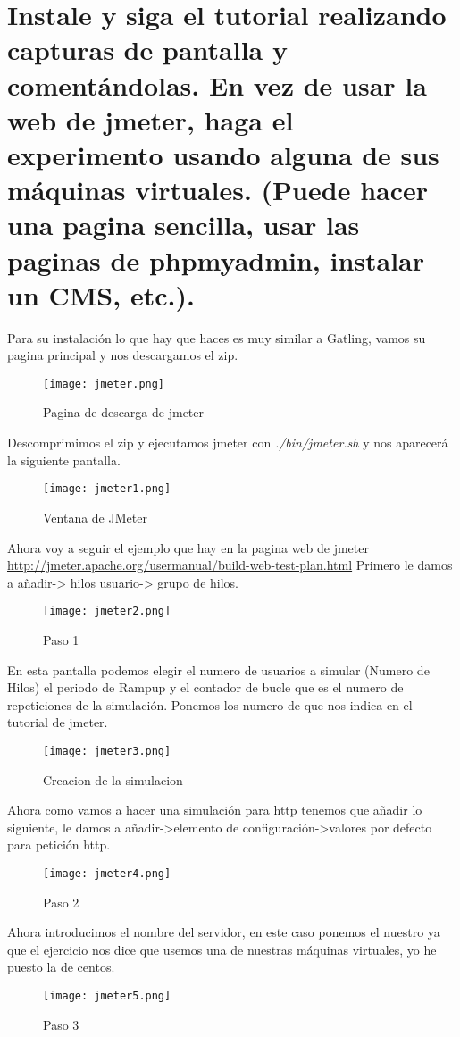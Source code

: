 \section{Instale y siga el tutorial realizando capturas de pantalla y comentándolas. En vez de usar la web de jmeter, haga el experimento usando alguna de sus máquinas virtuales. (Puede hacer una pagina sencilla, usar las paginas de phpmyadmin, instalar un CMS, etc.).}
Para su instalación lo que hay que haces es muy similar a Gatling, vamos su pagina principal y nos descargamos el zip.
\begin{figure}[H] 
\centering
\texttt{[image: jmeter.png]}  
\label{figura30:}
\caption{Pagina de descarga de jmeter}
\end{figure}
Descomprimimos el zip y ejecutamos jmeter con \textit{./bin/jmeter.sh} y nos aparecerá la siguiente pantalla.
\begin{figure}[H] 
\centering
\texttt{[image: jmeter1.png]}  
\label{figura31:}
\caption{Ventana de JMeter}
\end{figure}
Ahora voy a seguir el ejemplo que hay en la pagina web de jmeter \url{http://jmeter.apache.org/usermanual/build-web-test-plan.html} 
Primero le damos a añadir-> hilos usuario-> grupo de hilos.
\begin{figure}[H] 
\centering
\texttt{[image: jmeter2.png]}  
\label{figura32:}
\caption{Paso 1}
\end{figure}
En esta pantalla podemos elegir el numero de usuarios a simular (Numero de Hilos) el periodo de Rampup y el contador de bucle que es el numero de repeticiones de la simulación. Ponemos los numero de que nos indica en el tutorial de jmeter.
\begin{figure}[H] 
\centering
\texttt{[image: jmeter3.png]}  
\label{figura33:}
\caption{Creacion de la simulacion}
\end{figure}
Ahora como vamos a hacer una simulación para http tenemos que añadir lo siguiente, le damos a añadir->elemento de configuración->valores por defecto para petición http.
\begin{figure}[H] 
\centering
\texttt{[image: jmeter4.png]}  
\label{figura34:}
\caption{Paso 2}
\end{figure}
Ahora introducimos el nombre del servidor, en este caso ponemos el nuestro ya que el ejercicio nos dice que usemos una de nuestras máquinas virtuales, yo he puesto la de centos.
\begin{figure}[H] 
\centering
\texttt{[image: jmeter5.png]}  
\label{figura35:}
\caption{Paso 3}
\end{figure}
